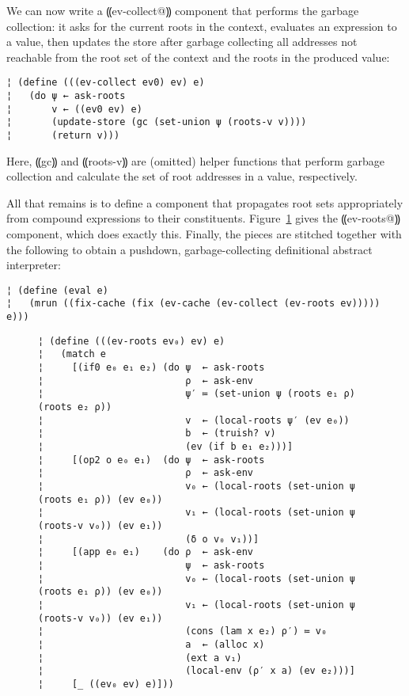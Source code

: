 We can now write a ⸨ev-collect@⸩ component that performs the garbage
collection: it asks for the current roots in the context, evaluates an
expression to a value, then updates the store after garbage collecting
all addresses not reachable from the root set of the context and the
roots in the produced value:
\begin{lstlisting}
¦ (define (((ev-collect ev0) ev) e)
¦   (do ψ ← ask-roots
¦       v ← ((ev0 ev) e)
¦       (update-store (gc (set-union ψ (roots-v v))))
¦       (return v)))
\end{lstlisting}
Here, ⸨gc⸩ and ⸨roots-v⸩ are (omitted) helper functions that perform
garbage collection and calculate the set of root addresses in a value,
respectively.

All that remains is to define a component that propagates root sets
appropriately from compound expressions to their constituents.
Figure~\ref{f:gc-collect-roots} gives the ⸨ev-roots@⸩ component, which
does exactly this.
%
Finally, the pieces are stitched together with the following to obtain
a pushdown, garbage-collecting definitional abstract interpreter:
\begin{lstlisting}
¦ (define (eval e)
¦   (mrun ((fix-cache (fix (ev-cache (ev-collect (ev-roots ev))))) e)))
\end{lstlisting}


\begin{figure} %
\begin{mdframed}
\figskip{}
\begin{lstlisting}
¦ (define (((ev-roots ev₀) ev) e)
¦   (match e
¦     [(if0 e₀ e₁ e₂) (do ψ  ← ask-roots
¦                         ρ  ← ask-env
¦                         ψ′ ≔ (set-union ψ (roots e₁ ρ) (roots e₂ ρ))
¦                         v  ← (local-roots ψ′ (ev e₀))
¦                         b  ← (truish? v)
¦                         (ev (if b e₁ e₂)))]
¦     [(op2 o e₀ e₁)  (do ψ  ← ask-roots
¦                         ρ  ← ask-env
¦                         v₀ ← (local-roots (set-union ψ (roots e₁ ρ)) (ev e₀))
¦                         v₁ ← (local-roots (set-union ψ (roots-v v₀)) (ev e₁))
¦                         (δ o v₀ v₁))]
¦     [(app e₀ e₁)    (do ρ  ← ask-env
¦                         ψ  ← ask-roots
¦                         v₀ ← (local-roots (set-union ψ (roots e₁ ρ)) (ev e₀))
¦                         v₁ ← (local-roots (set-union ψ (roots-v v₀)) (ev e₁))
¦                         (cons (lam x e₂) ρ′) ≔ v₀
¦                         a  ← (alloc x)
¦                         (ext a v₁)
¦                         (local-env (ρ′ x a) (ev e₂)))]
¦     [_ ((ev₀ ev) e)]))
\end{lstlisting}
\label{f:gc-collect-roots}
\end{mdframed}
\end{figure} %




